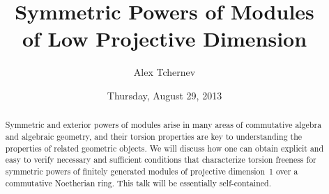 \documentclass{UAmathtalk}
\author{Alex Tchernev}
\title{Symmetric Powers of Modules\\ of Low Projective Dimension}
\date{Thursday, August 29, 2013}
\begin{document}
\maketitle

\begin{abstract}
Symmetric and exterior powers of modules arise in many areas of commutative algebra and algebraic geometry, and their torsion properties are key to understanding the properties of related geometric objects.
We will discuss how one can obtain explicit and easy to verify necessary and sufficient conditions that characterize torsion freeness for symmetric powers of finitely generated modules of projective dimension~1 over a commutative Noetherian ring.
This talk will be essentially self-contained.
\end{abstract}
\end{document}
